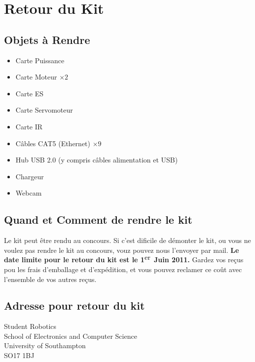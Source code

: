 \section {Retour du Kit}
\label{sec:kit-return}

\subsection {Objets à Rendre}

\begin{itemize}
\item Carte Puissance
\item Carte Moteur $\times 2$
\item Carte ES
\item Carte Servomoteur
\item Carte IR
\item Câbles CAT5 (Ethernet) $\times 9$
\item Hub USB 2.0 (y compris câbles alimentation et USB)
\item Chargeur
\item Webcam
\end{itemize}

\subsection {Quand et Comment de rendre le kit}

Le kit peut être rendu au concours. Si c'est dificile de démonter le kit, ou
vous ne voulez pas rendre le kit au concours, vouz pouvez nous l'envoyer par
mail.
\textbf{Le date limite pour le retour du kit est le 1$^{\hbox{er}}$ Juin 2011.}
Gardez vos reçus pou les frais d'emballage et d'expédition, et vous pouvez
reclamer ce coût avec l'ensemble de vos autres reçus.

\subsection {Adresse pour retour du kit}

Student Robotics\\
School of Electronics and Computer Science\\
University of Southampton\\
SO17 1BJ
